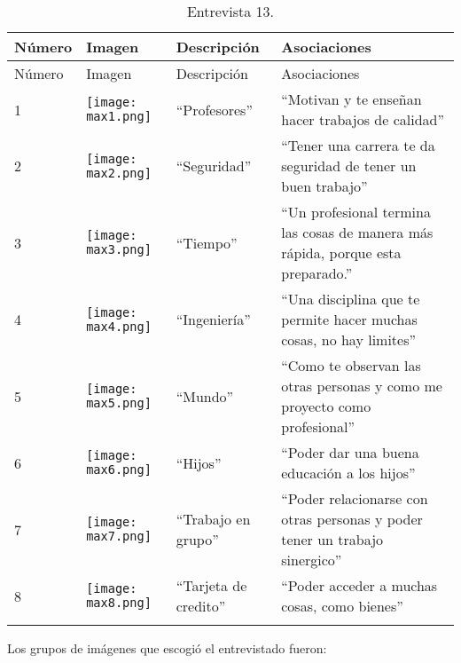\begin{longtable}{>{\centering\arraybackslash}m{1cm} >{\centering\arraybackslash}m{2cm} >{\arraybackslash}m{5cm}>{\arraybackslash}m{5cm}}
	
	\hline
	Número & Imagen & Descripción & Asociaciones \\
	\hline \hline
	\endfirsthead
	
	\hline
	Número & Imagen & Descripción & Asociaciones \\
	\hline \hline
	\endhead

1 & \texttt{[image: max1.png]} & ``Profesores'' & ``Motivan y te enseñan hacer trabajos de calidad'' \\
\hline

2 & \texttt{[image: max2.png]} & ``Seguridad'' & ``Tener una carrera te da seguridad de tener un buen trabajo'' \\
\hline

3 & \texttt{[image: max3.png]} & ``Tiempo'' & ``Un profesional termina las cosas de manera más rápida, porque esta preparado.'' \\
\hline

4 & \texttt{[image: max4.png]} & ``Ingeniería'' & ``Una disciplina que te permite hacer muchas cosas, no hay limites'' \\
\hline

5 & \texttt{[image: max5.png]} & ``Mundo'' & ``Como te observan las otras personas y como me proyecto como profesional'' \\
\hline

6 & \texttt{[image: max6.png]} & ``Hijos'' & ``Poder dar una buena educación a los hijos'' \\
\hline

7 & \texttt{[image: max7.png]} & ``Trabajo en grupo'' & ``Poder relacionarse con otras personas y poder tener un trabajo sinergico'' \\
\hline

8 & \texttt{[image: max8.png]} & ``Tarjeta de credito'' & ``Poder acceder a muchas cosas, como bienes'' \\
\hline

\caption{Entrevista 13.}
\label{tabla:max}
\end{longtable}

Los grupos de imágenes que escogió el entrevistado fueron:\\

